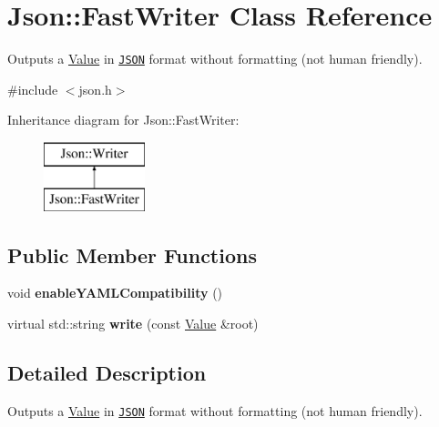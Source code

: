 \hypertarget{class_json_1_1_fast_writer}{\section{Json\-:\-:Fast\-Writer Class Reference}
\label{class_json_1_1_fast_writer}
}


Outputs a \hyperlink{class_json_1_1_value}{Value} in \href{http://www.json.org}{\tt J\-S\-O\-N} format without formatting (not human friendly).  




{\ttfamily \#include $<$json.\-h$>$}

Inheritance diagram for Json\-:\-:Fast\-Writer\-:\begin{figure}[H]
\begin{center}
\leavevmode
\includegraphics[height=2.000000cm]{class_json_1_1_fast_writer}
\end{center}
\end{figure}
\subsection*{Public Member Functions}
\begin{DoxyCompactItemize}
\item 
\hypertarget{class_json_1_1_fast_writer_a78d98e9f76d33660ad6e6a1abe287d45}{void {\bfseries enable\-Y\-A\-M\-L\-Compatibility} ()}\label{class_json_1_1_fast_writer_a78d98e9f76d33660ad6e6a1abe287d45}

\item 
\hypertarget{class_json_1_1_fast_writer_aa66218a56447222f91d64db618935a19}{virtual std\-::string {\bfseries write} (const \hyperlink{class_json_1_1_value}{Value} \&root)}\label{class_json_1_1_fast_writer_aa66218a56447222f91d64db618935a19}

\end{DoxyCompactItemize}


\subsection{Detailed Description}
Outputs a \hyperlink{class_json_1_1_value}{Value} in \href{http://www.json.org}{\tt J\-S\-O\-N} format without formatting (not human friendly). 

